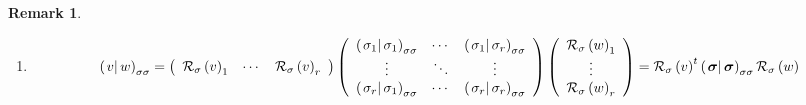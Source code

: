 \documentclass[aps,preprint]{revtex4}
\newtheorem{remark}[theorem]{Remark}
\begin{document}
\begin{remark}
\begin{enumerate}
\begin{enumerate}
\item 
\begin{equation}
\left( \left. v\right\vert w\right) _{\sigma \sigma }=\left( 
\begin{array}{ccc}
\mathcal{R}_{\sigma }\left( v\right) _{1} & \cdots & \mathcal{R}_{\sigma
}\left( v\right) _{r}%
\end{array}%
\right) \left( 
\begin{array}{ccc}
\left( \left. \sigma _{1}\right\vert \sigma _{1}\right) _{\sigma \sigma } & 
\cdots & \left( \left. \sigma _{1}\right\vert \sigma _{r}\right) _{\sigma
\sigma } \\ 
\vdots & \ddots & \vdots \\ 
\left( \left. \sigma _{r}\right\vert \sigma _{1}\right) _{\sigma \sigma } & 
\cdots & \left( \left. \sigma _{r}\right\vert \sigma _{r}\right) _{\sigma
\sigma }%
\end{array}%
\right) \left( 
\begin{array}{c}
\mathcal{R}_{\sigma }\left( w\right) _{1} \\ 
\vdots \\ 
\mathcal{R}_{\sigma }\left( w\right) _{r}%
\end{array}%
\right) =\mathcal{R}_{\sigma }\left( v\right) ^{t}\left( \left. \boldsymbol{%
\sigma }\right\vert \boldsymbol{\sigma }\right) _{\sigma \sigma }\mathcal{R}%
_{\sigma }\left( w\right)
\end{equation}
\end{enumerate}


\end{enumerate}
\end{remark}
\end{document}
